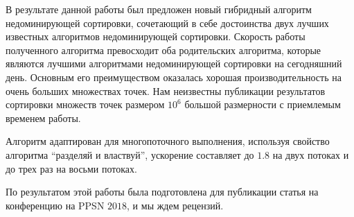 \startconclusionpage

В результате данной работы был предложен новый гибридный алгоритм недоминирующей сортировки, сочетающий в себе достоинства двух лучших известных алгоритмов недоминирующей сортировки. Скорость работы полученного алгоритма превосходит оба родительских алгоритма, которые являются лучшими алгоритмами недоминирующей сортировки на сегодняшний день. Основным его преимуществом оказалась хорошая производительность на очень больших множествах точек. Нам неизвестны публикации результатов сортировки множеств точек размером $10^6$ большой размерности с приемлемым временем работы.

Алгоритм адаптирован для многопоточного выполнения, используя свойство алгоритма ``разделяй и властвуй'', ускорение составляет до $1.8$ на двух потоках и до трех раз на восьми потоках.

По результатом этой работы была подготовлена для публикации статья на конференцию на PPSN $2018$, и мы ждем рецензий. 